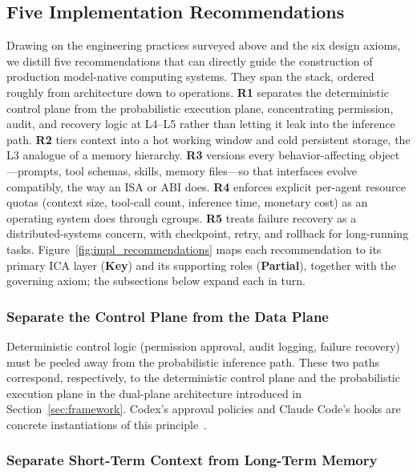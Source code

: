 \subsection{Five Implementation Recommendations}
\label{sec:impl-recommendations}

Drawing on the engineering practices surveyed above and the six design axioms, we distill five recommendations that can directly guide the construction of production model-native computing systems. They span the stack, ordered roughly from architecture down to operations. \textbf{R1} separates the deterministic control plane from the probabilistic execution plane, concentrating permission, audit, and recovery logic at L4--L5 rather than letting it leak into the inference path. \textbf{R2} tiers context into a hot working window and cold persistent storage, the L3 analogue of a memory hierarchy. \textbf{R3} versions every behavior-affecting object---prompts, tool schemas, skills, memory files---so that interfaces evolve compatibly, the way an ISA or ABI does. \textbf{R4} enforces explicit per-agent resource quotas (context size, tool-call count, inference time, monetary cost) as an operating system does through cgroups. \textbf{R5} treats failure recovery as a distributed-systems concern, with checkpoint, retry, and rollback for long-running tasks. Figure~\ref{fig:impl_recommendations} maps each recommendation to its primary ICA layer (\textbf{Key}) and its supporting roles (\textbf{Partial}), together with the governing axiom; the subsections below expand each in turn.



\subsubsection{Separate the Control Plane from the Data Plane}

Deterministic control logic (permission approval, audit logging, failure recovery) must be peeled away from the probabilistic inference path. These two paths correspond, respectively, to the deterministic control plane and the probabilistic execution plane in the dual-plane architecture introduced in Section~\ref{sec:framework}. Codex's approval policies and Claude Code's hooks are concrete instantiations of this principle~\cite{openai_codex_approvals_2026,anthropic_claudecode_security_2026}.

\subsubsection{Separate Short-Term Context from Long-Term Memory}

